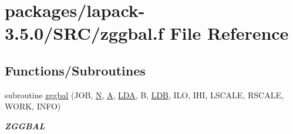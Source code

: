 \hypertarget{zggbal_8f}{}\section{packages/lapack-\/3.5.0/\+S\+R\+C/zggbal.f File Reference}
\label{zggbal_8f}
\subsection*{Functions/\+Subroutines}
\begin{DoxyCompactItemize}
\item 
subroutine \hyperlink{group__complex16GBcomputational_ga4b75373735df92b29116cf3bc549e363}{zggbal} (J\+O\+B, \hyperlink{polmisc_8c_a0240ac851181b84ac374872dc5434ee4}{N}, \hyperlink{classA}{A}, \hyperlink{example__user_8c_ae946da542ce0db94dced19b2ecefd1aa}{L\+D\+A}, B, \hyperlink{example__user_8c_a50e90a7104df172b5a89a06c47fcca04}{L\+D\+B}, I\+L\+O, I\+H\+I, L\+S\+C\+A\+L\+E, R\+S\+C\+A\+L\+E, W\+O\+R\+K, I\+N\+F\+O)
\begin{DoxyCompactList}\small\item\em {\bfseries Z\+G\+G\+B\+A\+L} \end{DoxyCompactList}\end{DoxyCompactItemize}
